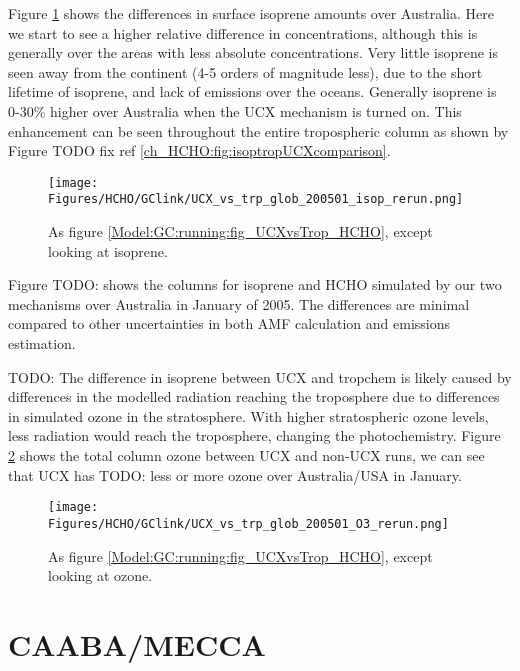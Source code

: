      Figure \ref{Model:GC:running:fig_UCXvsTrop_Isop} shows the differences in surface isoprene amounts over Australia.
      Here we start to see a higher relative difference in concentrations, although this is generally over the areas with less absolute concentrations. 
      Very little isoprene is seen away from the continent (4-5 orders of magnitude less), due to the short lifetime of isoprene, and lack of emissions over the oceans.
      Generally isoprene is 0-30\% higher over Australia when the UCX mechanism is turned on.
      This enhancement can be seen throughout the entire tropospheric column as shown by Figure TODO fix ref \ref{ch_HCHO:fig:isoptropUCXcomparison}. %
      \begin{figure}%
        \texttt{[image: Figures/HCHO/GClink/UCX\_vs\_trp\_glob\_200501\_isop\_rerun.png]}
        \caption{ %
          As figure \ref{Model:GC:running:fig_UCXvsTrop_HCHO}, except looking at isoprene. 
        }      
        \label{Model:GC:running:fig_UCXvsTrop_Isop}
      \end{figure}
      
      
      Figure TODO: shows the columns for isoprene and HCHO simulated by our two mechanisms over Australia in January of 2005.
      The differences are minimal compared to other uncertainties in both AMF calculation and emissions estimation.
      
      
      TODO: The difference in isoprene between UCX and tropchem is likely caused by differences in the modelled radiation reaching the troposphere due to differences in simulated ozone in the stratosphere.
      With higher stratospheric ozone levels, less radiation would reach the troposphere, changing the photochemistry.
      Figure \ref{Model:GC:running:fig_UCXvsTrop_O3} shows the total column ozone between UCX and non-UCX runs, we can see that UCX has TODO: less or more ozone over Australia/USA in January.
          
      \begin{figure}%
        \texttt{[image: Figures/HCHO/GClink/UCX\_vs\_trp\_glob\_200501\_O3\_rerun.png]}
        \caption{%
          As figure \ref{Model:GC:running:fig_UCXvsTrop_HCHO}, except looking at ozone. 
        }
        \label{Model:GC:running:fig_UCXvsTrop_O3}
      \end{figure}

\section{CAABA/MECCA}
\label{Model:CM}


